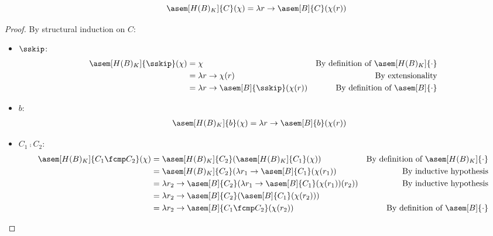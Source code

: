 \begin{theorem}[Distributivity]
    \label{thm:hyper-add}
    $$\asem[H(B)_K]{C}(\mathcal{\chi}) = \lambda r \to \asem[B]{C}(\chi(r))$$
\end{theorem}
\begin{proof}
  By structural induction on $C$:
  \begin{itemize}
    \item $\sskip$:
      \begin{align*}
        \asem[H(B)_K]{\sskip}(\chi) 
          &= \chi
          &\text{By definition of $\asem[H(B)_K]{\cdot}$} \\
          &= \lambda r \to \chi(r) 
          &\text{By extensionality}\\
          &= \lambda r \to \asem[B]{\sskip}(\chi(r))
          &\text{By definition of $\asem[B]{\cdot}$} \\
      \end{align*}

    \item $b$:
      \begin{align*}
        \asem[H(B)_K]{b}(\chi) 
          &= \lambda r \to \asem[B]{b}(\chi(r))
      \end{align*}

    \item $C_1 \fcmp C_2$:
      \begin{align*}
        \asem[H(B)_K]{C_1 \fcmp C_2}(\chi) 
          &= \asem[H(B)_K]{C_2}(\asem[H(B)_K]{C_1}(\chi))
          &\text{By definition of $\asem[H(B)_K]{\cdot}$} \\
          &= \asem[H(B)_K]{C_2}(\lambda r_1 \to 
            \asem[B]{C_1}(\chi(r_1))
          &\text{By inductive hypothesis} \\
          &= \lambda r_2 \to \asem[B]{C_2}(\lambda r_1 \to 
            \asem[B]{C_1}(\chi(r_1))(r_2))
          &\text{By inductive hypothesis} \\
          &= \lambda r_2 \to 
            \asem[B]{C_2}(\asem[B]{C_1}(\chi(r_2))) \\
          &= \lambda r_2 \to \asem[B]{C_1 \fcmp C_2}(\chi(r_2))
          &\text{By definition of $\asem[B]{\cdot}$} \\
      \end{align*}


\end{itemize}
\end{proof}
